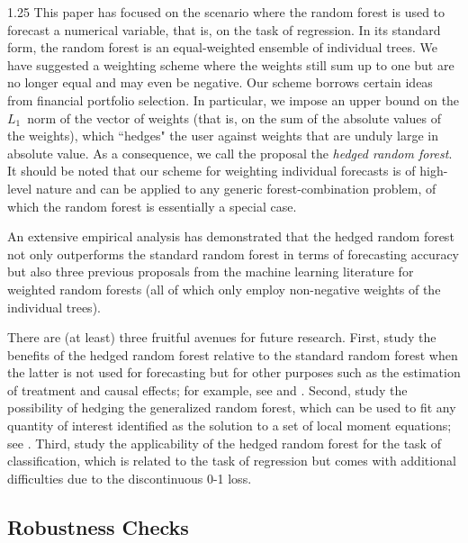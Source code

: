 \documentclass[12pt]{article}
\numberwithin{equation}{section}
\theoremstyle{plain}
\begin{document}
\begin{spacing}{1.25}
This paper has focused on the scenario where the random forest is used to forecast a numerical variable, that is, on the task of regression. In its standard form, the random forest is an equal-weighted ensemble of individual trees. We have suggested a weighting scheme where the weights still sum up to one but are no longer equal and may even be negative. Our scheme borrows certain ideas from financial portfolio selection. In particular, we impose an upper bound on the $L_1$~norm of the vector of weights (that is, on the sum of the absolute values of the weights), which ``hedges" the user against weights that are unduly large in absolute value.
As a consequence, we call the proposal the {\em hedged random forest}. It should be noted that our scheme for weighting individual forecasts is of high-level nature and can be applied to any generic forest-combination problem, of which the random forest is essentially a special case.

An extensive empirical analysis has demonstrated that the hedged random forest not only outperforms the standard random forest in terms of forecasting accuracy but also three previous proposals from the machine learning literature for weighted random forests (all of which only employ non-negative weights of the individual trees).

There are (at least) three fruitful avenues for future research. First, study the benefits of the hedged random forest relative to the standard random forest when the latter is not used for forecasting but for other purposes such as the estimation of treatment and causal effects; for example, see \cite{athey:imbens:2016} and \cite{wager:athey:2018}.
Second, study the possibility of hedging the generalized random forest, which can be used to fit any quantity of interest identified as the solution to a set of local moment equations; see \cite{athey:tibshirani:wager:2019}. Third, study the applicability of the hedged random forest for the task of classification, which is related to the task of regression but comes with additional difficulties due to the discontinuous 0-1 loss.

\newpage

    
% 


\newpage

\begin{appendix}
\section{Robustness Checks}
  \label{app:robust}


\end{appendix}
\end{spacing}
\end{document}
